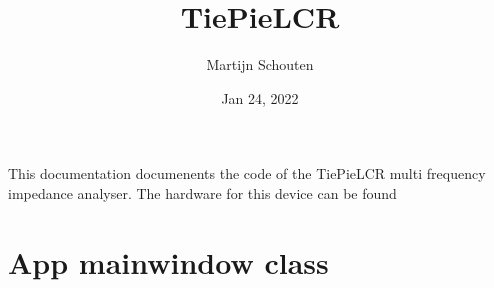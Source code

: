 \documentclass[letterpaper,10pt,english]{sphinxmanual}
\title{TiePieLCR}
\date{Jan 24, 2022}
\author{Martijn Schouten}
\begin{document}
\pagestyle{empty}
\sphinxmaketitle
\pagestyle{plain}
\sphinxtableofcontents
\pagestyle{normal}
\label{\detokenize{index::doc}}


\sphinxAtStartPar
This documentation documenents the code of the TiePieLCR multi frequency impedance analyser. The hardware for this device can be found 


\chapter{App mainwindow class}
\label{\detokenize{index:module-app}}\label{\detokenize{index:app-mainwindow-class}}\label{\detokenize{index:module-MainWindow}}
\end{document}
